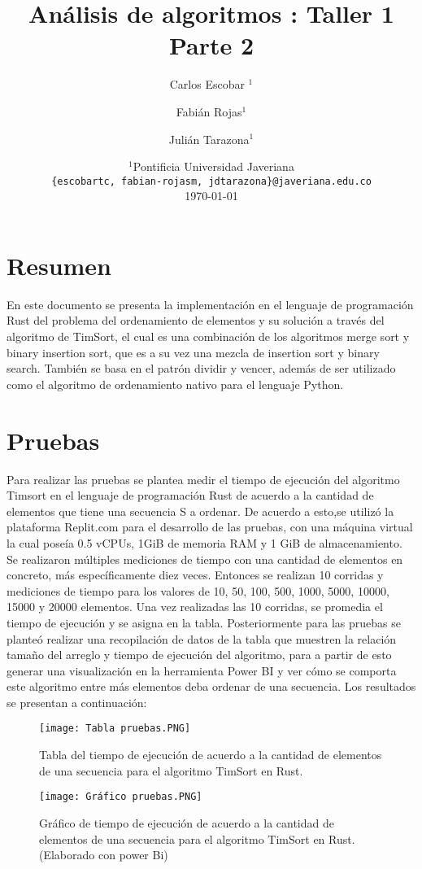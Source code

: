 \documentclass[a4paper]{article}
\title{Análisis de algoritmos : Taller 1 Parte 2}
\author{Carlos Escobar $^1$ \and Fabián Rojas$^1$ \and Julián Tarazona$^1$}
\date{
	$^1$Pontificia Universidad Javeriana \\ \texttt{\{escobartc, fabian-rojasm, jdtarazona\}@javeriana.edu.co}\\%
	\today
}
\theoremstyle{plain}
\theoremstyle{definition}
\begin{document}
	\maketitle
\section{Resumen}
	\label{sec:def}
	\hspace
	En este documento se presenta la implementación en el lenguaje de programación Rust del problema del ordenamiento de
    elementos y su solución a través del algoritmo de TimSort, el cual es
    una combinación de los algoritmos merge sort y binary insertion sort, que es a su vez una mezcla de insertion sort y binary search. 
    También se basa en el patrón dividir y vencer, además de ser utilizado como 
    el algoritmo de ordenamiento nativo para el lenguaje Python. 

	
	\section{Pruebas}
	\label{sec:def}
	\hspace
	Para realizar las pruebas se plantea medir el tiempo de ejecución del algoritmo Timsort en el lenguaje de programación Rust de acuerdo a la cantidad de elementos que tiene una secuencia S a ordenar. De acuerdo a esto,se utilizó la plataforma Replit.com para el desarrollo de las pruebas, con una máquina virtual la cual poseía 0.5 vCPUs, 1GiB de memoria RAM y 1 GiB de almacenamiento. Se realizaron múltiples mediciones de tiempo con una cantidad de elementos en concreto, más específicamente diez veces. Entonces se realizan 10 corridas y mediciones de tiempo para los valores de 10, 50, 100, 500, 1000, 5000, 10000, 15000 y 20000 elementos. Una vez realizadas las 10 corridas, se promedia el tiempo de ejecución y se asigna en la tabla. Posteriormente para las pruebas se planteó realizar una recopilación de datos de la tabla que muestren la relación tamaño del arreglo y tiempo de ejecución del algoritmo, para a partir de esto generar una visualización en la herramienta Power BI y ver cómo se comporta este algoritmo entre más elementos deba ordenar de una secuencia. Los resultados se presentan a continuación:
	
  
  
  \begin{figure}[H]
        \centering
        \texttt{[image: Tabla pruebas.PNG]}
        \caption{Tabla del tiempo de ejecución de acuerdo a la cantidad de elementos de una secuencia para el algoritmo TimSort en Rust.}
        \label{fig:ger}
    \end{figure}
  \begin{figure}[H]
        \centering
        \texttt{[image: Gráfico pruebas.PNG]}
        \caption{Gráfico de tiempo de ejecución de acuerdo a la cantidad de elementos de una secuencia para el algoritmo TimSort en Rust. (Elaborado con power Bi)}
        \label{fig:ger}
    \end{figure}
\end{document}
